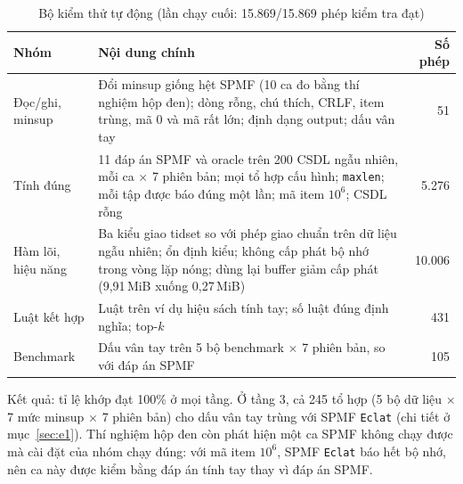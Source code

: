 \begin{table}[t]
\caption{Bộ kiểm thử tự động (lần chạy cuối: 15.869/15.869 phép kiểm tra đạt)}
\label{tab:b02}
\centering
\footnotesize
\setlength{\tabcolsep}{3pt}
\begin{tabular}{@{}p{1.75cm}p{5.0cm}r@{}}
\toprule
Nhóm & Nội dung chính & Số phép \\
\midrule
Đọc/ghi, minsup & Đổi minsup giống hệt SPMF (10 ca đo bằng thí nghiệm hộp đen); dòng rỗng, chú thích, CRLF, item trùng, mã 0 và mã rất lớn; định dạng output; dấu vân tay & 51 \\
Tính đúng & 11 đáp án SPMF và oracle trên 200 CSDL ngẫu nhiên, mỗi ca $\times$ 7 phiên bản; mọi tổ hợp cấu hình; \texttt{maxlen}; mỗi tập được báo đúng một lần; mã item $10^6$; CSDL rỗng & 5.276 \\
Hàm lõi, hiệu năng & Ba kiểu giao tidset so với phép giao chuẩn trên dữ liệu ngẫu nhiên; ổn định kiểu; không cấp phát bộ nhớ trong vòng lặp nóng; dùng lại buffer giảm cấp phát (9,91\,MiB xuống 0,27\,MiB) & 10.006 \\
Luật kết hợp & Luật trên ví dụ hiệu sách tính tay; số luật đúng định nghĩa; top-$k$ & 431 \\
Benchmark & Dấu vân tay trên 5 bộ benchmark $\times$ 7 phiên bản, so với đáp án SPMF & 105 \\
\bottomrule
\end{tabular}
\end{table}

Kết quả: tỉ lệ khớp đạt 100\% ở mọi tầng. Ở tầng 3, cả 245 tổ hợp (5 bộ dữ liệu $\times$ 7 mức minsup $\times$ 7 phiên bản) cho dấu vân tay trùng với SPMF \texttt{Eclat} (chi tiết ở mục~\ref{sec:e1}). Thí nghiệm hộp đen còn phát hiện một ca SPMF không chạy được mà cài đặt của nhóm chạy đúng: với mã item $10^6$, SPMF \texttt{Eclat} báo hết bộ nhớ, nên ca này được kiểm bằng đáp án tính tay thay vì đáp án SPMF.
